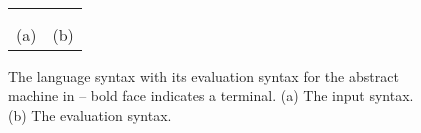 





\newsavebox{\boxLangSyntax}

\begin{lrbox}{\boxLangSyntax}
\begin{minipage}[c]{0.3\linewidth}
\cfgstart
{}
\cfgrule{\thread}{\lp\cfgnt{\cmd}~$\ldots$~$\bot$\rp}
\cfgrule{\cmd}{\lp\cfgt{\sendi}~\cfgt{\aid}~\cfgt{\num}~\cfgt{\num}\rp}
   \cfgorline{\lp\cfgt{\recvi}~\cfgt{\aid}~\cfgt{\num}~\cfgt{\num}~\cfgt{\aid}\rp}
   \cfgorline{\lp\cfgt{\wait}~\cfgt{\aid}\rp}
   \cfgorline{\lp\cfgt{\barrier}~\cfgt{\aid}\rp}
\
    \cfgorline{\cfgt{$\ast$}}
\cfgrule{\rcvp}{\lp\aid~$\ldots$\rp}
\cfgend
\end{minipage}
\end{lrbox}


\newsavebox{\boxEvalSyntax}
\begin{lrbox}{\boxEvalSyntax}
\begin{minipage}[c]{0.3\linewidth}
\cfgstart
{}
\cfgrule{\epsnd}{\cfgt{\mt}\
   \cfgor\lp\cfgnt{\epsnd}~\lb\lp\cfgt{\num}\ \cfgt{\num}\rp~$\rightarrow$~\cfgt{\num}\rb\rp}
\cfgrule{\eprcv}{\cfgt{\mt}\
   \cfgor\lp\cfgnt{\eprcv}~\lb\lp\cfgt{\num}\ \cfgt{\num}\rp~$\rightarrow$~\cfgt{\num}\rb\rp}
\cfgrule{\epbarrier}{\cfgt{\mt}\
   \cfgor\lp\cfgnt{\epbarrier}~\lb\cfgnt{\aid}~$\rightarrow$~\cfgt{\num}\rb\rp}
\cfgend
\end{minipage}
\end{lrbox}

\begin{figure}
\begin{center}
\setlength{\tabcolsep}{15pt}
\begin{tabular}{cc}
\scalebox{0.75}{\usebox{\boxLangSyntax}}
&
\scalebox{0.75}{\usebox{\boxEvalSyntax}}
\\ \\
(a) & (b)
\end{tabular}
\end{center}
\caption{The language syntax with its evaluation syntax for the abstract machine in  -- bold face indicates a terminal. (a) The input syntax. (b) The evaluation syntax.}
\label{fig:expr:stx}
\end{figure}

\examplefigthree




